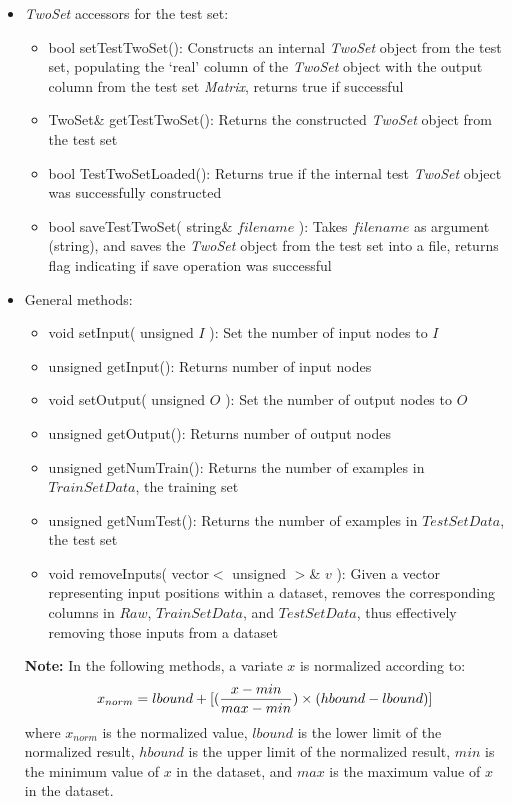 \documentclass{report}
\def\beginred{\color{red}}
\def\endcolor{\color{black}}
\begin{document}
\begin{itemize}
\begin{itemize}
\item {\em TwoSet} accessors for the test set:
\begin{itemize}
\item \beginred bool setTestTwoSet(): Constructs an internal {\em
      TwoSet} object from the test set, populating the `real' column
      of the {\em TwoSet} object with the output column from the test
      set {\em Matrix}, returns true if successful \endcolor
\item TwoSet\& getTestTwoSet(): Returns the constructed {\em TwoSet}
      object from the test set
\item bool TestTwoSetLoaded(): Returns true if the internal test {\em
      TwoSet} object was successfully constructed
\item bool saveTestTwoSet( string\& $filename$ ): Takes $filename$ as
      argument (string), and saves the {\em TwoSet} object from the
      test set into a file, returns flag indicating if save operation
      was successful
\end{itemize}

\item General methods:
\begin{itemize}
\item void setInput( unsigned $I$ ): Set the number of input nodes to
      $I$
\item \beginred unsigned getInput(): Returns number of input nodes
      \endcolor
\item void setOutput( unsigned $O$ ): Set the number of output nodes
      to $O$
\item \beginred unsigned getOutput(): Returns number of output nodes
      \endcolor
\item \beginred unsigned getNumTrain(): Returns the number of
      examples in $TrainSetData$, the training set \endcolor
\item \beginred unsigned getNumTest(): Returns the number of examples
      in $TestSetData$, the test set \endcolor
\item \beginred void removeInputs( vector$<$ unsigned $>$\& $v$ ):
      Given a vector representing input positions within a dataset,
      removes the corresponding columns in $Raw$, $TrainSetData$, and
      $TestSetData$, thus effectively removing those inputs from a
      dataset \endcolor
\end{itemize}

{\bf Note:} In the following methods, a variate $x$ is normalized
according to:
\begin{equation}\label{normEqn}
x_{norm} = lbound + [({{x - min} \over {max - min}}) \times (hbound -
lbound)]
\end{equation}
where $x_{norm}$ is the normalized value, $lbound$ is the lower limit
of the normalized result, $hbound$ is the upper limit of the
normalized result, $min$ is the minimum value of $x$ in the dataset,
and $max$ is the maximum value of $x$ in the dataset.


\end{itemize}
\end{itemize}
\end{document}
